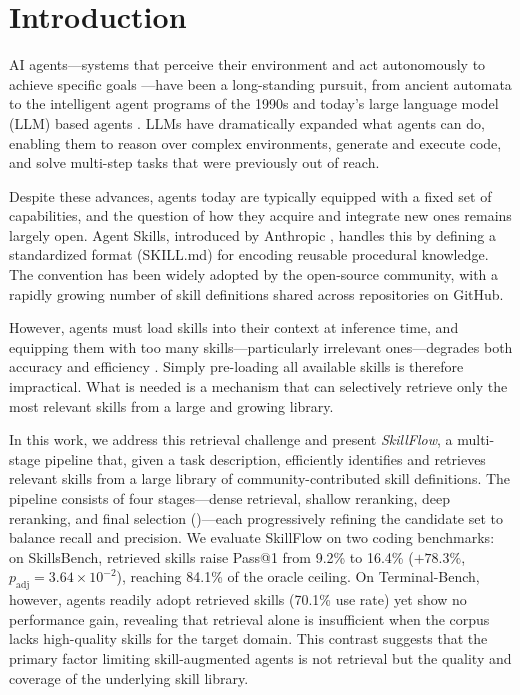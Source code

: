 \documentclass[11pt]{article}
\begin{document}
\section{Introduction}
\label{sec:introduction}

AI agents---systems that perceive their environment and act autonomously to achieve specific goals \citep{wooldridge_intelligent_1995,russell_artificial_2016,carbonell_is_1997}---have been a long-standing pursuit, from ancient automata \citep{de_solla_price_automata_1964} to the intelligent agent programs of the 1990s and today's large language model (LLM) based agents \citep{durante_agent_2024}.
LLMs have dramatically expanded what agents can do, enabling them to reason over complex environments, generate and execute code, and solve multi-step tasks that were previously out of reach.

Despite these advances, agents today are typically equipped with a fixed set of capabilities, and the question of how they acquire and integrate new ones remains largely open.
Agent Skills, introduced by Anthropic \citep{noauthor_overview_nodate}, handles this by defining a standardized format (SKILL.md) for encoding reusable procedural knowledge.
The convention has been widely adopted by the open-source community, with a rapidly growing number of skill definitions shared across repositories on GitHub.

However, agents must load skills into their context at inference time, and equipping them with too many skills---particularly irrelevant ones---degrades both accuracy and efficiency \citep{li_skillsbench_2026,engineer_agentsmd_2026}.
Simply pre-loading all available skills is therefore impractical. What is needed is a mechanism that can selectively retrieve only the most relevant skills from a large and growing library.

In this work, we address this retrieval challenge and present \textit{SkillFlow}, a multi-stage pipeline that, given a task description, efficiently identifies and retrieves relevant skills from a large library of community-contributed skill definitions.
The pipeline consists of four stages---dense retrieval, shallow reranking, deep reranking, and final selection ()---each progressively refining the candidate set to balance recall and precision.
We evaluate SkillFlow on two coding benchmarks: on SkillsBench, retrieved skills raise Pass@1 from 9.2\% to 16.4\% ($+78.3\%$, $p_{\text{adj}} = 3.64 \times 10^{-2}$), reaching 84.1\% of the oracle ceiling.
On Terminal-Bench, however, agents readily adopt retrieved skills (70.1\% use rate) yet show no performance gain, revealing that retrieval alone is insufficient when the corpus lacks high-quality skills for the target domain.
This contrast suggests that the primary factor limiting skill-augmented agents is not retrieval but the quality and coverage of the underlying skill library.
\end{document}
